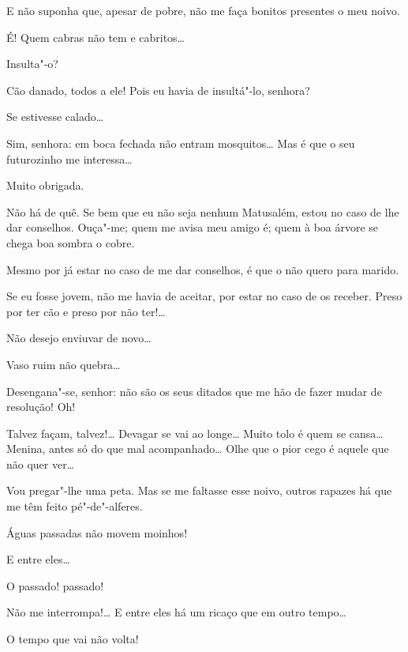  E não suponha que, apesar de pobre, não me faça bonitos presentes
o meu noivo.

  É! Quem cabras não tem e cabritos\ldots{}

  Insulta"-o?

  Cão danado, todos a ele! Pois eu havia de insultá"-lo, senhora?

  Se estivesse calado\ldots{}

  Sim, senhora: em boca fechada não entram mosquitos\ldots{} Mas é
que o seu futurozinho me interessa\ldots{}

  Muito obrigada. 

  Não há de quê. Se bem que eu não seja nenhum Matusalém, estou no
caso de lhe dar conselhos. Ouça"-me; quem me avisa meu amigo é; quem à boa árvore
se chega boa sombra o cobre.

  Mesmo por já estar no caso de me dar conselhos, é que o não quero
para marido.

  Se eu fosse jovem, não me havia de aceitar, por estar no caso de
os receber. Preso por ter cão e preso por não ter!\ldots{}

  Não desejo enviuvar de novo\ldots{}

  Vaso ruim não quebra\ldots{}

  Desengana"-se, senhor: não são os seus ditados que me hão de fazer
mudar de resolução!  Oh!

  Talvez façam, talvez!\ldots{} Devagar se
vai ao longe\ldots{} Muito tolo é quem se cansa\ldots{}  Menina,
antes só do que mal acompanhado\ldots{} Olhe que o pior cego é aquele que não
quer ver\ldots{}

   Vou pregar"-lhe uma peta.   Mas se me
faltasse esse noivo, outros rapazes há que me têm feito pé"-de"-alferes.

  Águas passadas não movem moinhos!

  E entre eles\ldots{}

 O passado! passado!

  Não me interrompa!\ldots{} E entre eles há um ricaço que em outro
tempo\ldots{}

 O tempo que vai não volta!

